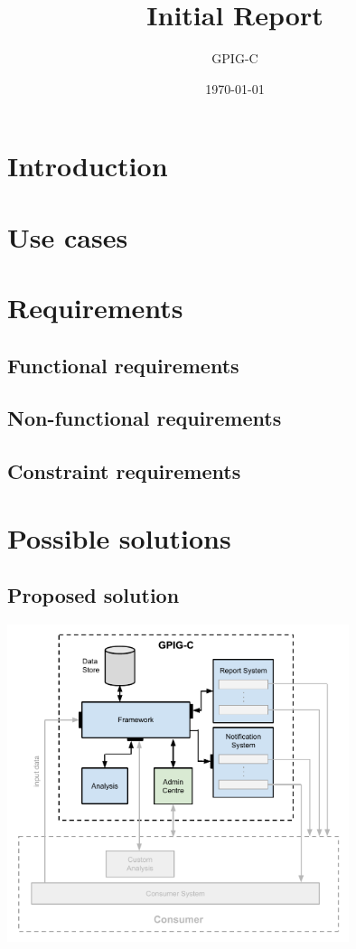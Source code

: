 \documentclass[10pt,a4paper]{article}
\begin{document}
\title{Initial Report}
\author{GPIG-C}
\date{\today}
\maketitle
\thispagestyle{fancy} %

\section{Introduction}


\section{Use cases}


\section{Requirements}

\subsection{Functional requirements}

\subsection{Non-functional requirements}

\subsection{Constraint requirements}


\section{Possible solutions}

\subsection{Proposed solution}

\includegraphics[width=0.75\textwidth]{system-architecture.pdf}
\end{document}
